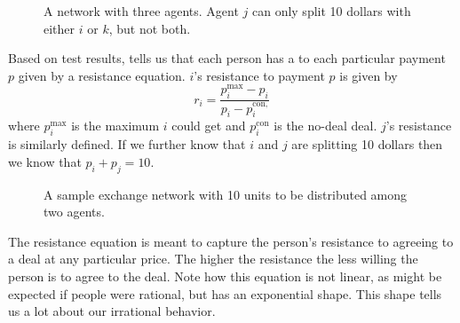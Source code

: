 \begin{SCfigure}
  \begin{minipage}{1.0\linewidth}
    \begin{center}
    \end{center}    
  \end{minipage}
  \caption{A network with three agents. Agent $j$ can only split 10
    dollars with either $i$ or $k$, but not both.}
  \label{fig:net-3agents}
\end{SCfigure}

Based on test results,  tells us that each person has a
 to each particular payment $p$ given by a resistance
equation.  $i$'s resistance to payment $p$ is given by
\begin{equation}
  \label{eq:resistance}
 r_i = \frac{p_{i}^{\text{max}} - p_i}{p_i - p_i^{\text{con,}}}
\end{equation}
where $p_i^{\text{max}}$ is the maximum $i$ could get and
$p_i^{\text{con}}$ is the no-deal deal. $j$'s resistance is similarly
defined. If we further know that $i$ and $j$ are splitting 10 dollars
then we know that $p_i + p_j = 10$.

\begin{SCfigure}
  \begin{minipage}{1.0\linewidth}
    \begin{center}
    \end{center}
  \end{minipage}
  \caption{A sample exchange network with 10 units to be distributed
    among two agents.}
  \label{fig:10}
\end{SCfigure}


The resistance equation is meant to capture the person's resistance to
agreeing to a deal at any particular price. The higher the resistance
the less willing the person is to agree to the deal. Note how this
equation is not linear, as might be expected if people were rational,
but has an exponential shape. This shape tells us a lot about our
irrational behavior.

